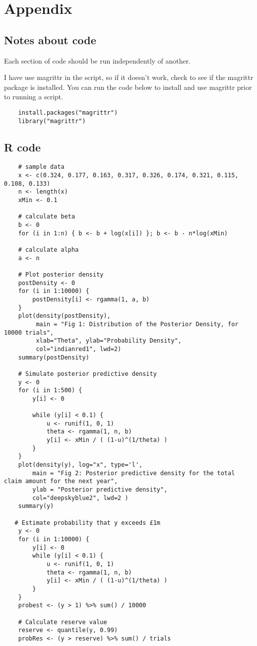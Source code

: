 \section{Appendix}

\subsection{Notes about code}
    Each section of code should be run independently of another. 
    
    I have use magrittr in the script, so if it doesn't work, check to see if the magrittr package is installed. You can run the code below to install and use magrittr prior to running a script.

    \begin{lstlisting}
    install.packages("magrittr")
    library("magrittr")
    \end{lstlisting}

\subsection{R code}

    \begin{lstlisting}
    # sample data
    x <- c(0.324, 0.177, 0.163, 0.317, 0.326, 0.174, 0.321, 0.115, 0.108, 0.133)
    n <- length(x)
    xMin <- 0.1
    
    # calculate beta
    b <- 0 
    for (i in 1:n) { b <- b + log(x[i]) }; b <- b - n*log(xMin)
    
    # calculate alpha
    a <- n 
    
    # Plot posterior density
    postDensity <- 0
    for (i in 1:10000) {
        postDensity[i] <- rgamma(1, a, b)
    }
    plot(density(postDensity),
         main = "Fig 1: Distribution of the Posterior Density, for 10000 trials",
         xlab="Theta", ylab="Probability Density",
         col="indianred1", lwd=2)
    summary(postDensity)
    
    # Simulate posterior predictive density
    y <- 0
    for (i in 1:500) {
        y[i] <- 0
        
        while (y[i] < 0.1) {
            u <- runif(1, 0, 1)
            theta <- rgamma(1, n, b)
            y[i] <- xMin / ( (1-u)^(1/theta) )
        }
    }
    plot(density(y), log="x", type='l',
        main = "Fig 2: Posterior predictive density for the total claim amount for the next year",
        ylab = "Posterior predictive density",
        col="deepskyblue2", lwd=2 )
    summary(y)
    
   # Estimate probability that y exceeds £1m
    y <- 0
    for (i in 1:10000) {
        y[i] <- 0
        while (y[i] < 0.1) {
            u <- runif(1, 0, 1)
            theta <- rgamma(1, n, b)
            y[i] <- xMin / ( (1-u)^(1/theta) )
        }
    }
    probest <- (y > 1) %>% sum() / 10000
    
    # Calculate reserve value
    reserve <- quantile(y, 0.99)
    probRes <- (y > reserve) %>% sum() / trials
    
    \end{lstlisting}
